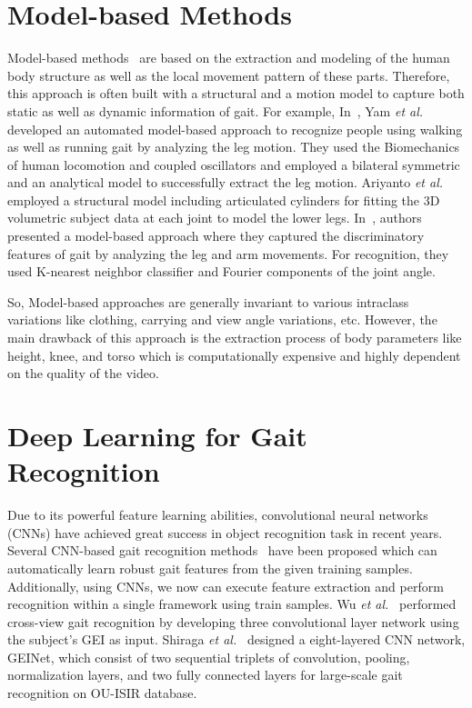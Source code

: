 \section{Model-based Methods}
Model-based methods~\cite{Yam_04, Ariyanto_11, Tafazzoli_10, Feng_16} are based on the extraction and modeling of the human body structure as well as the local movement pattern of these parts. Therefore, this approach is often built with a structural and a motion model to capture both static as well as dynamic information of gait. For example, In~\cite{Yam_04}, Yam \textit{et al.} developed an automated model-based approach to recognize people using walking as well as running gait by analyzing the leg motion. They used the Biomechanics of human locomotion and coupled oscillators and employed a bilateral symmetric and an analytical model to successfully extract the leg motion. Ariyanto \textit{et al.}~\cite{Ariyanto_11} employed a structural model including articulated cylinders for fitting the 3D volumetric subject data at each joint to model the lower legs. In~\cite{Tafazzoli_10}, authors presented a model-based approach where they captured the discriminatory features of gait by analyzing the leg and arm movements. For recognition, they used K-nearest neighbor classifier and Fourier components of the joint angle. 

So, Model-based approaches are generally invariant to various intraclass variations like clothing, carrying and view angle variations, etc. However, the main drawback of this approach is the extraction process of body parameters like height, knee, and torso which is computationally expensive and highly dependent on the quality of the video.


\section{Deep Learning for Gait Recognition}
Due to its powerful feature learning abilities, convolutional neural networks (CNNs) have achieved great success in object recognition task in recent years. Several CNN-based gait recognition methods~\cite{Wu_17, Shiraga_16, Wolf_16, Zhang_16, Yu_17, Yu_19} have been proposed which can automatically learn robust gait features from the given training samples. Additionally, using CNNs, we now can execute feature extraction and perform recognition within a single framework using train samples. Wu \textit{et al.}~\cite{Wu_17} performed cross-view gait recognition by developing three convolutional layer network using the subject's GEI as input. Shiraga \textit{et al.}~\cite{Shiraga_16} designed a eight-layered CNN network, GEINet, which consist of two sequential triplets of convolution, pooling, normalization layers, and two fully connected layers for large-scale gait recognition on OU-ISIR database. 

